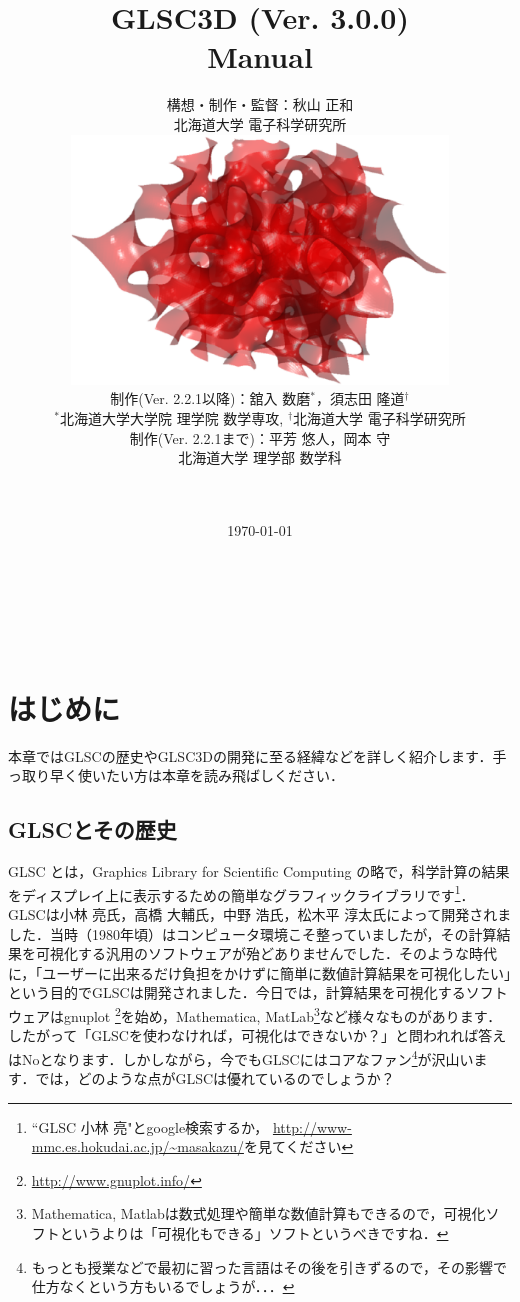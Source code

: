 \documentclass[platex,a4paper,12pt]{jsarticle}%
\title{\vspace{10mm}\Huge{GLSC3D (Ver. 3.0.0) \\ Manual}}
\author{\Large{構想・制作・監督：秋山 正和}\\\vspace{5mm}
北海道大学 電子科学研究所 \vspace{1zw} \\
\includegraphics[width=100mm]{CoverPage.eps} \vspace{1zw} \\
\Large{制作(Ver. 2.2.1以降)：舘入 数磨$^*$，須志田 隆道$^\dagger$} \\
$^*$北海道大学大学院 理学院 数学専攻,  $^\dagger$北海道大学 電子科学研究所
\vspace{1zw}\\ 
\Large{制作(Ver. 2.2.1まで)：平芳 悠人，岡本 守} \\
北海道大学 理学部 数学科\\
\\
\\
\date{\today}
}
\begin{document}
\maketitle
\thispagestyle{empty}


\newpage
\thispagestyle{empty}
　
\newpage

\setcounter{tocdepth}{3}
\tableofcontents

\newpage
\thispagestyle{empty}
　
\newpage

\section{はじめに}

本章ではGLSCの歴史やGLSC3Dの開発に至る経緯などを詳しく紹介します．手っ取り早く使いたい方は本章を読み飛ばしください．

\subsection{GLSCとその歴史}

GLSC とは，Graphics Library for Scientific Computing の略で，科学計算の結果をディスプレイ上に表示するための簡単なグラフィックライブラリです\footnote{``GLSC 小林 亮"とgoogle検索するか，
\url{http://www-mmc.es.hokudai.ac.jp/~masakazu/}を見てください}．GLSCは小林 亮氏，高橋 大輔氏，中野 浩氏，松木平 淳太氏によって開発されました．当時（1980年頃）はコンピュータ環境こそ整っていましたが，その計算結果を可視化する汎用のソフトウェアが殆どありませんでした．そのような時代に，「ユーザーに出来るだけ負担をかけずに簡単に数値計算結果を可視化したい」という目的でGLSCは開発されました．今日では，計算結果を可視化するソフトウェアはgnuplot \footnote{\url{http://www.gnuplot.info/}}を始め，Mathematica, MatLab\footnote{Mathematica, Matlabは数式処理や簡単な数値計算もできるので，可視化ソフトというよりは「可視化もできる」ソフトというべきですね．}など様々なものがあります．したがって「GLSCを使わなければ，可視化はできないか？」と問われれば答えはNoとなります．しかしながら，今でもGLSCにはコアなファン\footnote{もっとも授業などで最初に習った言語はその後を引きずるので，その影響で仕方なくという方もいるでしょうが．．．}が沢山います．では，どのような点がGLSCは優れているのでしょうか？

\newpage
\end{document}
